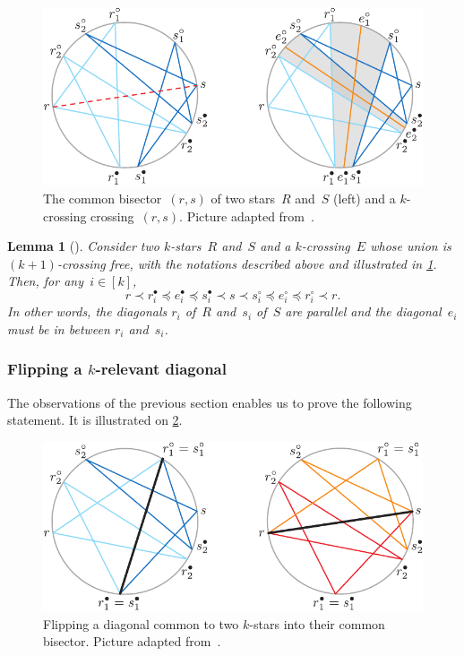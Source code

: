 \documentclass{amsart}
\newtheorem{lemma}[theorem]{Lemma}
\theoremstyle{remark}
\newcommand{\cl}{\prec}
\newcommand{\cle}{\preccurlyeq}
\begin{document}
\begin{figure}
	\capstart
	\centerline{\includegraphics[scale=.8]{combisector}}
	\caption{The common bisector~$(r,s)$ of two stars~$R$ and~$S$ (left) and a $k$-crossing crossing~$(r,s)$. Picture adapted from~\cite[Fig.~4]{PilaudSantos-multitriangulations}.}
	\label{fig:combisector}
\end{figure}

\begin{lemma}[{\cite[Lems.~3.6 \& 3.7]{PilaudSantos-multitriangulations}}]
\label{lem:crossingCommonBisector}
Consider two $k$-stars~$R$ and~$S$ and a $k$-crossing~$E$ whose union is $(k+1)$-crossing free, with the notations described above and illustrated in \cref{fig:combisector}. Then, for any~$i \in [k]$,
\[
r \cl r^\bullet_i \cle e^\bullet_i \cle s^\bullet_i \cl s \cl s^\circ_i \cle e^\circ_i  \cle r^\circ_i \cl r.
\]
In other words, the diagonals $r_i$ of~$R$ and~$s_i$ of~$S$ are parallel and the diagonal~$e_i$ must be in between $r_i$ and~$s_i$.
\end{lemma}


\subsubsection{Flipping a $k$-relevant diagonal}

The observations of the previous section enables us to prove the following statement.
It is illustrated on \cref{fig:flip}.


\begin{figure}
	\capstart
	\centerline{\includegraphics[scale=.8]{flip}}
	\caption{Flipping a diagonal common to two $k$-stars into their common bisector. Picture adapted from~\cite[Fig.~5]{PilaudSantos-multitriangulations}.}
	\label{fig:flip}
\end{figure}
\end{document}
